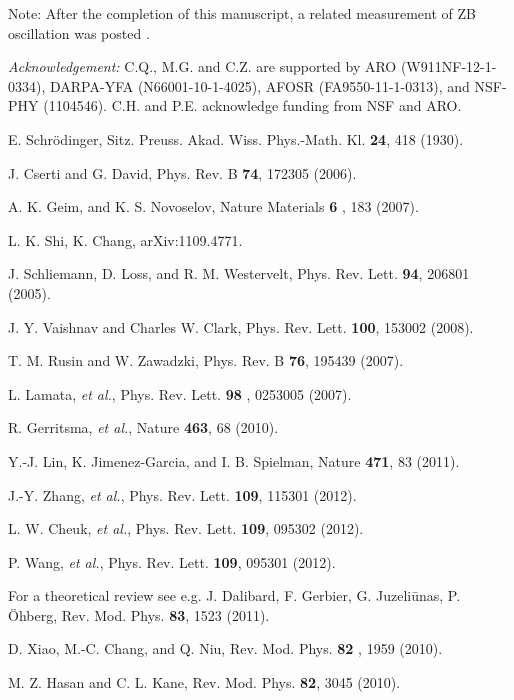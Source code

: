 \documentclass[prl,aps,twocolumn,showpacs,floatfix]{revtex4-1}
\begin{document}
Note: After the completion of this manuscript, a related measurement of ZB
oscillation was posted \cite{SpielmanZB}.

\textit{Acknowledgement:} C.Q., M.G. and C.Z. are supported by ARO
(W911NF-12-1-0334), DARPA-YFA (N66001-10-1-4025), AFOSR (FA9550-11-1-0313),
and NSF-PHY (1104546). C.H. and P.E. acknowledge funding from NSF and ARO.

\begin{thebibliography}{99}
 E. Schr\"{o}dinger, Sitz. Preuss. Akad. Wiss. Phys.-Math.
Kl. \textbf{24}, 418 (1930).

 J. Cserti and G. David, Phys. Rev. B \textbf{74},
172305 (2006).

 A. K. Geim, and K. S. Novoselov, Nature Materials \textbf{6}%
, 183 (2007).

 L. K. Shi, K. Chang, arXiv:1109.4771.

 J. Schliemann, D. Loss, and R. M. Westervelt,
Phys. Rev. Lett. \textbf{94}, 206801 (2005).

 J. Y. Vaishnav and Charles W. Clark, Phys. Rev. Lett.
\textbf{100}, 153002 (2008).

 T. M. Rusin and W. Zawadzki, Phys. Rev. B \textbf{76},
195439 (2007).

 L. Lamata, \textit{et al.}, Phys. Rev. Lett. \textbf{98%
}, 0253005 (2007).

 R. Gerritsma, \textit{et al.}, Nature \textbf{463}, 68
(2010).

 Y.-J. Lin, K. Jimenez-Garcia, and I. B. Spielman, Nature
\textbf{471}, 83 (2011).

 J.-Y. Zhang, \textit{et al.}, Phys.
Rev. Lett. \textbf{109}, 115301 (2012).

 L. W. Cheuk, \textit{et al.}, Phys.
Rev. Lett. \textbf{109}, 095302 (2012).

 P. Wang, \textit{et al.}, Phys. Rev. Lett.
\textbf{109}, 095301 (2012).

 For a theoretical review see e.g. J. Dalibard, F.
Gerbier, G. Juzeli\={u}nas, P. \"{O}hberg, Rev. Mod. Phys. \textbf{83}, 1523
(2011).

 D. Xiao, M.-C. Chang, and Q. Niu, Rev. Mod. Phys. \textbf{82}%
, 1959 (2010).

 M. Z. Hasan and C. L. Kane, Rev. Mod. Phys. \textbf{82},
3045 (2010).


\end{thebibliography}
\end{document}
